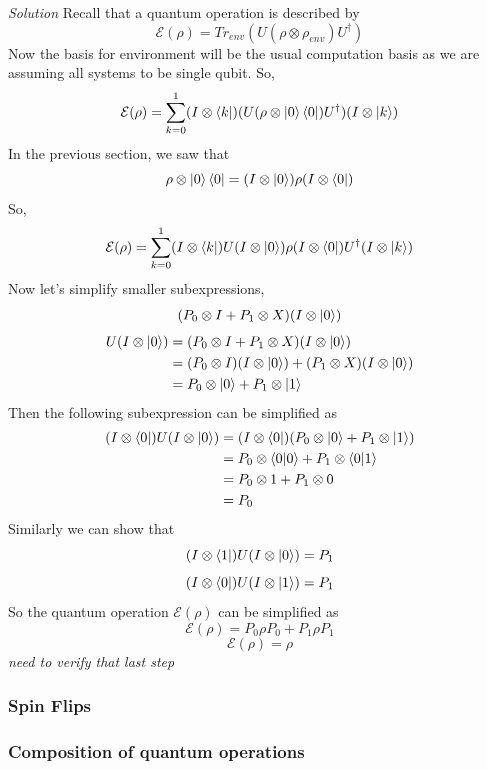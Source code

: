 \documentclass{article}
\begin{document}
\textit{Solution} Recall that a quantum operation is described by
\[\mathcal{E}(\rho) = Tr_{env}(U(\rho \otimes \rho_{env})U^{\dagger})\]
Now the basis for environment will be the usual computation basis as we are
assuming all systems to be single qubit. So,
\[\mathcal{E}(\rho) = \sum_{k=0}^{1}(I \otimes \bra{k})(U(\rho \otimes \ket{0}\bra{0})U^{\dagger})(I \otimes \ket{k})\]
In the previous section, we saw that
\[\rho \otimes \ket{0}\bra{0} = (I\otimes \ket{0})\rho(I \otimes \bra{0})\]
So,
\[\mathcal{E}(\rho) = \sum_{k=0}^{1}(I \otimes \bra{k})U(I\otimes \ket{0})\rho(I \otimes \bra{0})U^{\dagger}(I \otimes \ket{k})\]
Now let's simplify smaller subexpressions,
\[ (P_0 \otimes I  + P_1 \otimes X)(I\otimes \ket{0})\]
\begin{equation} \label{eq1}
\begin{split}
 U(I\otimes \ket{0}) &= (P_0 \otimes I  + P_1 \otimes X)(I\otimes \ket{0})\\
 &= (P_0 \otimes I)(I\otimes \ket{0}) + (P_1 \otimes X)(I\otimes \ket{0}) \\
 &= P_0 \otimes \ket{0} + P_1 \otimes \ket{1}\\
\end{split}
\end{equation}
Then the following subexpression can be simplified as
\begin{equation} \label{eq2}
\begin{split}
 (I\otimes \bra{0})U(I\otimes \ket{0}) &= (I\otimes \bra{0})(P_0 \otimes \ket{0} + P_1 \otimes \ket{1})\\
 &= P_0 \otimes \bra{0}\ket{0} + P_1 \otimes \bra{0}\ket{1}\\
 &= P_0 \otimes 1 + P_1 \otimes 0\\
 &= P_0
\end{split}
\end{equation}
Similarly we can show that
\[(I\otimes \bra{1})U(I\otimes \ket{0}) = P_1\]
\[(I\otimes \bra{0})U(I\otimes \ket{1}) = P_1\]
So the quantum operation \(\mathcal{E}(\rho)\) can be simplified as
\[\mathcal{E}(\rho) = P_0 \rho P_0 + P_1 \rho P_1\]
\[\mathcal{E}(\rho) = \rho\]
\textit{need to verify that last step}
\subsubsection*{Spin Flips}
\subsubsection*{Composition of quantum operations}
\end{document}
